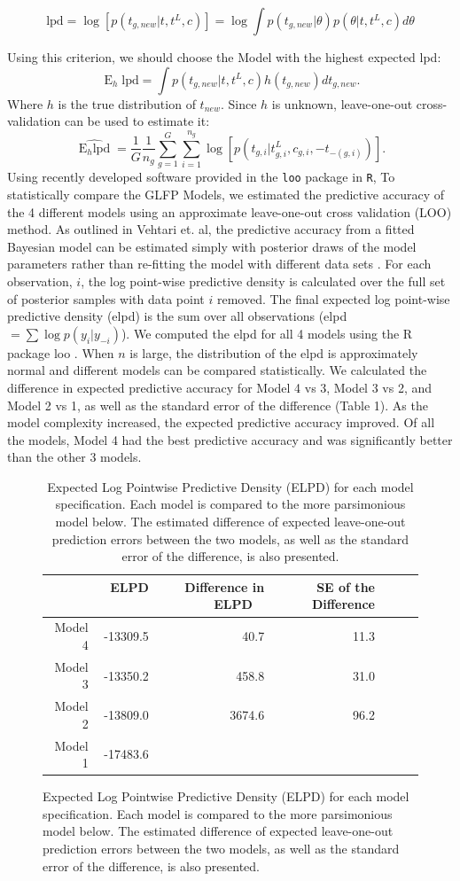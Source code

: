 \documentclass[12pt]{article}
\newcommand{\op}{\operatorname}
\begin{document}
\begin{equation}
\mbox{lpd} = \log[p(t_{g, new}|t, t^L, c)] = \log \int p(t_{g, new}|\theta) p(\theta|t,t^L,c) d\theta
\end{equation}

Using this criterion, we should choose the Model with the highest expected lpd:
\begin{equation}
\op{E}_h \mbox{lpd} = \int p(t_{g,new}|t,t^L,c) h(t_{g,new}) d t_{g,new}.
\end{equation}
Where $h$ is the true distribution of $t_{new}$. Since $h$ is unknown, leave-one-out cross-validation can be used to estimate it:
\begin{equation}
\widehat{\op{E}_h \mbox{lpd}} = \frac{1}{G}\frac{1}{n_g}\sum_{g=1}^G \sum_{i=1}^{n_g} \log [p(t_{g,i}|t_{g,i}^L,c_{g,i},-t_{-(g,i)})].
\end{equation}
Using recently developed software provided in the \texttt{loo} package in \texttt{R},
To statistically compare the GLFP Models, we estimated the predictive accuracy of the 4 different models using an approximate leave-one-out cross validation (LOO) method.  As outlined in Vehtari et. al, the predictive accuracy from a fitted Bayesian model can be estimated simply with posterior draws of the model parameters rather than re-fitting the model with different data sets \cite{vehtari}.  For each observation, $i$, the log point-wise predictive density is calculated over the full set of posterior samples with data point $i$ removed.  The final expected log point-wise predictive density (elpd) is the sum over all observations (elpd $=\sum{\log p(y_i|y_{-i})}$).  We computed the elpd for all 4 models using the R package loo \cite{loo}.  When $n$ is large, the distribution of the elpd is approximately normal and different models can be compared statistically.  We calculated the difference in expected predictive accuracy for Model 4 vs 3, Model 3 vs 2, and Model 2 vs 1, as well as the standard error of the difference (Table 1).  As the model complexity increased, the expected predictive accuracy improved.  Of all the models, Model 4 had the best predictive accuracy and was significantly better than the other 3 models.
\begin{figure}
\begin{table}[H]
\centering
\begin{tabular}{rrrrrrr}
  \hline
 & ELPD \ & Difference in ELPD \ & SE of the Difference \\ 
  \hline
Model 4 & -13309.5 & 40.7 & 11.3 \\ 
Model 3 & -13350.2 & 458.8 & 31.0  \\ 
Model 2 & -13809.0 & 3674.6 & 96.2 \\ 
Model 1 & -17483.6  \\ 
   \hline
\end{tabular}
\caption{Expected Log Pointwise Predictive Density (ELPD) for each model specification.  Each model is compared to the more parsimonious model below.  The estimated difference of expected leave-one-out prediction errors between the two models, as well as the standard error of the difference, is also presented.}
\label{table:1}
\end{table}
\end{figure}
\end{document}
